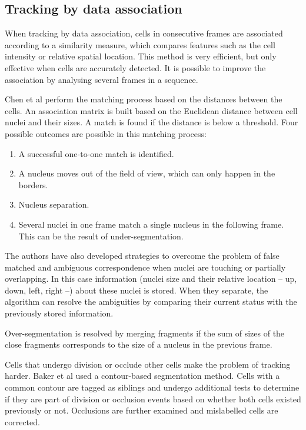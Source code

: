 
\subsection{Tracking by data association}
When tracking by data association, cells in consecutive frames are associated according to a similarity measure, which compares features such as the cell intensity or relative spatial location. This method is very efficient, but only effective when cells are accurately detected. It is possible to improve the association by analysing several frames in a sequence.

Chen et al \cite{chen06} perform the matching process based on the distances between the cells. An association matrix is built based on the Euclidean distance between cell nuclei and their sizes. A match is found if the distance is below a threshold. Four possible outcomes are possible in this matching process:

\begin{enumerate}
	\item A successful one-to-one match is identified.
	\item A nucleus moves out of the field of view, which can only happen in the borders.
	\item Nucleus separation.
	\item Several nuclei in one frame match a single nucleus in the following frame. This can be the result of under-segmentation.
\end{enumerate}

The authors have also developed strategies to overcome the problem of false matched and ambiguous correspondence when nuclei are touching or partially overlapping. In this case information (nuclei size and their relative location -- up, down, left, right --) about these nuclei is stored. When they separate, the algorithm can resolve the ambiguities by comparing their current status with the previously stored information.

Over-segmentation is resolved by merging fragments if the sum of sizes of the close fragments corresponds to the size of a nucleus in the previous frame.

Cells that undergo division or occlude other cells make the problem of tracking harder. Baker et al \cite{baker13} used a contour-based segmentation method. Cells with a common contour are tagged as siblings and undergo additional tests to determine if they are part of division or occlusion events based on whether both cells existed previously or not. Occlusions are further examined and mislabelled cells are corrected.


